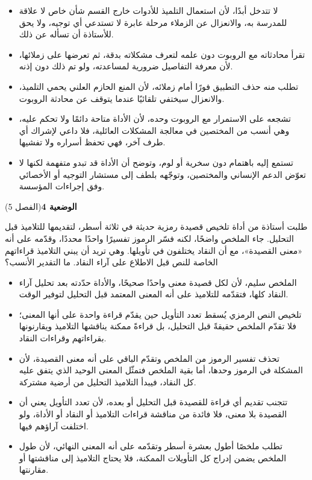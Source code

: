 \documentclass[11pt,a4paper]{article}
\begin{document}
\begin{itemize}[leftmargin=1.0cm, labelsep=6pt, itemsep=3pt, topsep=4pt, parsep=0pt]
  \item[\textbf{أ)}] لا تتدخل أبدًا، لأن استعمال التلميذ للأدوات خارج القسم شأن خاص لا علاقة للمدرسة به، والانعزال عن الزملاء مرحلة عابرة لا تستدعي أي توجيه، ولا يحق للأستاذة أن تسأله عن ذلك.
  \item[\textbf{ب)}] تقرأ محادثاته مع الروبوت دون علمه لتعرف مشكلاته بدقة، ثم تعرضها على زملائها، لأن معرفة التفاصيل ضرورية لمساعدته، ولو تم ذلك دون إذنه.
  \item[\textbf{ج)}] تطلب منه حذف التطبيق فورًا أمام زملائه، لأن المنع الحازم العلني يحمي التلميذ، والانعزال سيختفي تلقائيًا عندما يتوقف عن محادثة الروبوت.
  \item[\textbf{د)}] تشجعه على الاستمرار مع الروبوت وحده، لأن الأداة متاحة دائمًا ولا تحكم عليه، وهي أنسب من المختصين في معالجة المشكلات العائلية، فلا داعي لإشراك أي طرف آخر، فهي تحفظ أسراره ولا تفشيها.
  \item[\textbf{هـ)}] تستمع إليه باهتمام دون سخرية أو لوم، وتوضح أن الأداة قد تبدو متفهمة لكنها لا تعوّض الدعم الإنساني والمختصين، وتوجّهه بلطف إلى مستشار التوجيه أو الأخصائي وفق إجراءات المؤسسة.
\end{itemize}
\par\vspace{6pt}
\noindent
{\large\khatt\textbf{الوضعية 4}}\hfill{\small(الفصل 5)}\par\nopagebreak\vspace{3pt}
\setlength{\fboxsep}{7pt}\colorbox{gray!10}{\parbox{\dimexpr\linewidth-14pt}{طلبت أستاذة من أداة تلخيص قصيدة رمزية حديثة في ثلاثة أسطر، لتقديمها للتلاميذ قبل التحليل. جاء الملخص واضحًا، لكنه فسّر الرموز تفسيرًا واحدًا محددًا، وقدّمه على أنه «معنى القصيدة»، مع أن النقاد يختلفون في تأويلها. وهي تريد أن يبني التلاميذ قراءاتهم الخاصة للنص قبل الاطلاع على آراء النقاد. ما التقدير الأنسب؟}}\par\nopagebreak
\begin{itemize}[leftmargin=1.0cm, labelsep=6pt, itemsep=3pt, topsep=4pt, parsep=0pt]
  \item[\textbf{أ)}] الملخص سليم، لأن لكل قصيدة معنى واحدًا صحيحًا، والأداة حدّدته بعد تحليل آراء النقاد كلها، فتقدّمه للتلاميذ على أنه المعنى المعتمد قبل التحليل لتوفير الوقت.
  \item[\textbf{ب)}] تلخيص النص الرمزي يُسقط تعدد التأويل حين يقدّم قراءة واحدة على أنها المعنى؛ فلا تقدّم الملخص حقيقةً قبل التحليل، بل قراءةً ممكنة يناقشها التلاميذ ويقارنونها بقراءاتهم وقراءات النقاد.
  \item[\textbf{ج)}] تحذف تفسير الرموز من الملخص وتقدّم الباقي على أنه معنى القصيدة، لأن المشكلة في الرموز وحدها، أما بقية الملخص فتمثّل المعنى الوحيد الذي يتفق عليه كل النقاد، فيبدأ التلاميذ التحليل من أرضية مشتركة.
  \item[\textbf{د)}] تتجنب تقديم أي قراءة للقصيدة قبل التحليل أو بعده، لأن تعدد التأويل يعني أن القصيدة بلا معنى، فلا فائدة من مناقشة قراءات التلاميذ أو النقاد أو الأداة، ولو اختلفت آراؤهم فيها.
  \item[\textbf{هـ)}] تطلب ملخصًا أطول بعشرة أسطر وتقدّمه على أنه المعنى النهائي، لأن طول الملخص يضمن إدراج كل التأويلات الممكنة، فلا يحتاج التلاميذ إلى مناقشتها أو مقارنتها.
\end{itemize}
\end{document}
